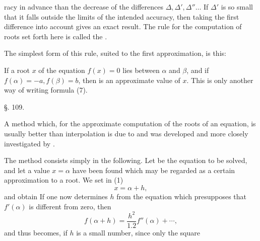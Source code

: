 racy in advance than the decrease of the differences
$\varDelta, \varDelta', \varDelta''\ldots$ If $\varDelta'$ is so small
that it falls outside the limits of the intended accuracy, then taking
the first difference into account gives an exact result. The rule for
the computation of roots set forth here is called the .

The simplest form of this rule, suited to the first approximation, is
this:

If a root $x$ of the equation $f(x)=0$ lies between $\alpha$ and
$\beta$, and if $f(\alpha) = -a, f(\beta) = b$, then
is an approximate value of $x$. This is only another way of writing
formula (7).

\begin{center}
§. 109.\\
\end{center}

A method which, for the approximate computation of the roots of an
equation, is usually better than interpolation is due to
 and was developed and more closely investigated by
.

The method consists simply in the following. Let
be the equation to be solved, and let a value $x = \alpha$ have been
found which may be regarded as a certain approximation to a root. We
set in (1)
\[ x = \alpha + h, \]
and obtain
If one now determines $h$ from the equation
which presupposes that $f'(\alpha)$ is different from zero, then
\[ f(\alpha+h) = \frac{h^2}{1.2}f''(\alpha) + \cdots, \]
and thus becomes, if $h$ is a small number, since only the square

